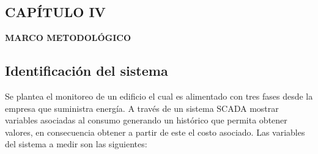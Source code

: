 \begin{center}
    \setcounter{section}{4}
    \section*{CAPÍTULO IV}
    \vspace*{0.5in}
    \textbf{MARCO METODOLÓGICO}
\end{center}
\setcounter{subsection}{0}

\subsection{Identificación del sistema}
    Se plantea el monitoreo de un edificio el cual es alimentado con tres fases desde la empresa que suministra energía. 
    A través de un sistema SCADA mostrar variables
    asociadas al consumo generando un histórico que permita obtener valores, en consecuencia obtener
    a partir de este el costo asociado. Las variables del sistema a medir son las siguientes:
